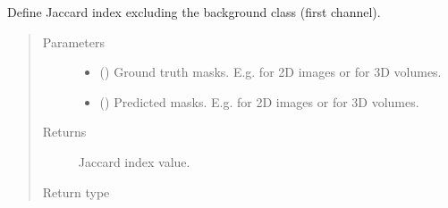 \documentclass[letterpaper,10pt,english]{sphinxmanual}
\begin{document}
\begin{fulllineitems}
\label{\detokenize{engine/metrics:engine.metrics.jaccard_index_numpy_without_background}}
Define Jaccard index excluding the background class (first channel).
\begin{quote}\begin{description}
\item[{Parameters}] \leavevmode\begin{itemize}
\item {} 
 () \textendash{} Ground truth masks. E.g.  for 2D images or
 for 3D volumes.

\item {} 
 () \textendash{} Predicted masks. E.g.  for 2D images or
 for 3D volumes.

\end{itemize}

\item[{Returns}] \leavevmode
{} \textendash{} Jaccard index value.

\item[{Return type}] \leavevmode
{}

\end{description}\end{quote}

\end{fulllineitems}

\end{document}
